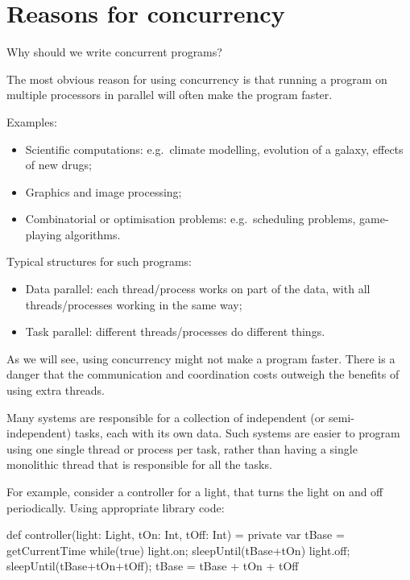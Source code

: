
\section{Reasons for concurrency}

Why should we write concurrent programs?

The most obvious reason for using concurrency is that running a program on
multiple processors in parallel will often make the program faster.


Examples:
%
\begin{itemize}
\item
Scientific computations: e.g.~climate modelling, evolution of a galaxy,
effects of new drugs;

\item
Graphics and image processing;

\item
Combinatorial or optimisation problems: e.g.~scheduling problems, game-playing
algorithms.
\end{itemize}

Typical structures for such programs:
%
\begin{itemize}
\item
Data parallel: each thread/process works on part of the data, with all
threads/processes working in the same way;

\item
Task parallel: different threads/processes do different things.
\end{itemize}
%

As we will see, using concurrency might not make a program faster.  There is a
danger that the communication and coordination costs outweigh the benefits of
using extra threads.



Many systems are responsible for a collection of independent (or
semi-independent) tasks, each with its own data.  Such systems are easier to
program using one single thread or process per task, rather than having a
single monolithic thread that is responsible for all the tasks.

For example, consider a controller for a light, that turns the light on and
off periodically.  Using appropriate library code:
%
\begin{scala}
def controller(light: Light, tOn: Int, tOff: Int) = {
  private var tBase = getCurrentTime
  while(true){
    light.on; sleepUntil(tBase+tOn)
    light.off; sleepUntil(tBase+tOn+tOff); tBase = tBase + tOn + tOff
  }
}
\end{scala}

